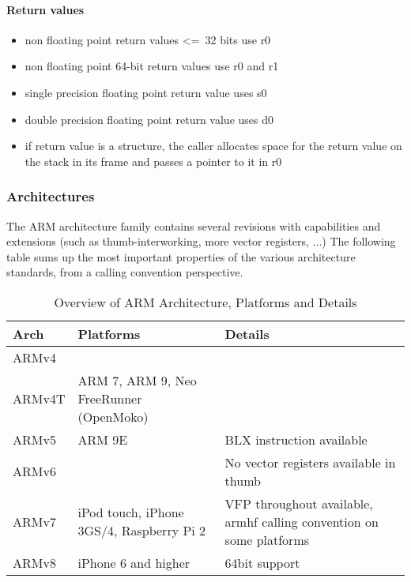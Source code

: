 \paragraph{Return values}
\begin{itemize}
\item non floating point return values \textless=\ 32 bits use r0
\item non floating point 64-bit return values use r0 and r1
\item single precision floating point return value uses s0
\item double precision floating point return value uses d0
\item if return value is a structure, the caller allocates space for the return value on the stack in its frame and passes a pointer to it in r0
\end{itemize}




\subsubsection{Architectures}

The ARM architecture family contains several revisions with capabilities and
extensions (such as thumb-interworking, more vector registers, ...) 
The following table sums up the most important properties of the various 
architecture standards, from a calling convention perspective.


\begin{table}[h]
\begin{tabular*}{0.95\textwidth}{lll}
Arch   & Platforms & Details \\
\hline
ARMv4  & & \\
ARMv4T & ARM 7, ARM 9, Neo FreeRunner (OpenMoko) & \\
ARMv5  & ARM 9E & BLX instruction available \\
ARMv6  & & No vector registers available in thumb \\
ARMv7  & iPod touch, iPhone 3GS/4, Raspberry Pi 2 & VFP throughout available, armhf calling convention on some platforms \\ 
ARMv8  & iPhone 6 and higher & 64bit support \\ 
\end{tabular*}
\caption{Overview of ARM Architecture, Platforms and Details}
\end{table}

\newpage

